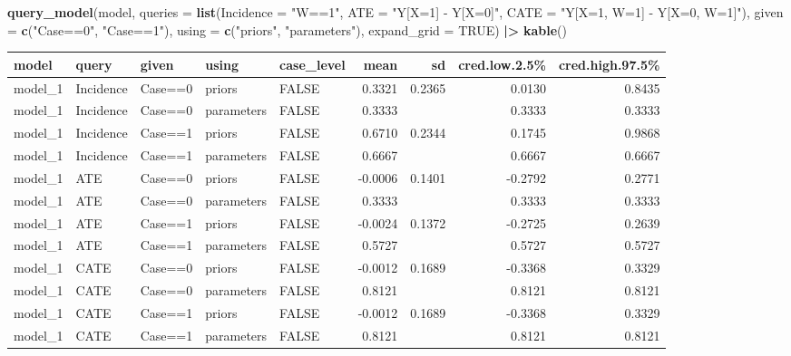 \documentclass[
  12pt,
]{book}
\newenvironment{Shaded}{\begin{snugshade}}{\end{snugshade}}
\newcommand{\AttributeTok}[1]{\textcolor[rgb]{0.13,0.29,0.53}{#1}}
\newcommand{\ConstantTok}[1]{\textcolor[rgb]{0.56,0.35,0.01}{#1}}
\newcommand{\FunctionTok}[1]{\textcolor[rgb]{0.13,0.29,0.53}{\textbf{#1}}}
\newcommand{\NormalTok}[1]{#1}
\newcommand{\SpecialCharTok}[1]{\textcolor[rgb]{0.81,0.36,0.00}{\textbf{#1}}}
\newcommand{\StringTok}[1]{\textcolor[rgb]{0.31,0.60,0.02}{#1}}
\begin{document}
\begin{Shaded}
\begin{Highlighting}[]
\FunctionTok{query\_model}\NormalTok{(model,}
            \AttributeTok{queries =} \FunctionTok{list}\NormalTok{(}\AttributeTok{Incidence =} \StringTok{"W==1"}\NormalTok{, }
                           \AttributeTok{ATE =} \StringTok{"Y[X=1] {-} Y[X=0]"}\NormalTok{, }
                           \AttributeTok{CATE =} \StringTok{"Y[X=1, W=1] {-} Y[X=0, W=1]"}\NormalTok{),}
            \AttributeTok{given =} \FunctionTok{c}\NormalTok{(}\StringTok{"Case==0"}\NormalTok{, }\StringTok{"Case==1"}\NormalTok{),}
            \AttributeTok{using =} \FunctionTok{c}\NormalTok{(}\StringTok{"priors"}\NormalTok{, }\StringTok{"parameters"}\NormalTok{), }\AttributeTok{expand\_grid =} \ConstantTok{TRUE}\NormalTok{) }\SpecialCharTok{|\textgreater{}} \FunctionTok{kable}\NormalTok{()}
\end{Highlighting}
\end{Shaded}

\begin{tabular}{l|l|l|l|l|r|r|r|r}
\hline
model & query & given & using & case\_level & mean & sd & cred.low.2.5\% & cred.high.97.5\%\\
\hline
model\_1 & Incidence & Case==0 & priors & FALSE & 0.3321 & 0.2365 & 0.0130 & 0.8435\\
\hline
model\_1 & Incidence & Case==0 & parameters & FALSE & 0.3333 &  & 0.3333 & 0.3333\\
\hline
model\_1 & Incidence & Case==1 & priors & FALSE & 0.6710 & 0.2344 & 0.1745 & 0.9868\\
\hline
model\_1 & Incidence & Case==1 & parameters & FALSE & 0.6667 &  & 0.6667 & 0.6667\\
\hline
model\_1 & ATE & Case==0 & priors & FALSE & -0.0006 & 0.1401 & -0.2792 & 0.2771\\
\hline
model\_1 & ATE & Case==0 & parameters & FALSE & 0.3333 &  & 0.3333 & 0.3333\\
\hline
model\_1 & ATE & Case==1 & priors & FALSE & -0.0024 & 0.1372 & -0.2725 & 0.2639\\
\hline
model\_1 & ATE & Case==1 & parameters & FALSE & 0.5727 &  & 0.5727 & 0.5727\\
\hline
model\_1 & CATE & Case==0 & priors & FALSE & -0.0012 & 0.1689 & -0.3368 & 0.3329\\
\hline
model\_1 & CATE & Case==0 & parameters & FALSE & 0.8121 &  & 0.8121 & 0.8121\\
\hline
model\_1 & CATE & Case==1 & priors & FALSE & -0.0012 & 0.1689 & -0.3368 & 0.3329\\
\hline
model\_1 & CATE & Case==1 & parameters & FALSE & 0.8121 &  & 0.8121 & 0.8121\\
\hline
\end{tabular}
\end{document}
